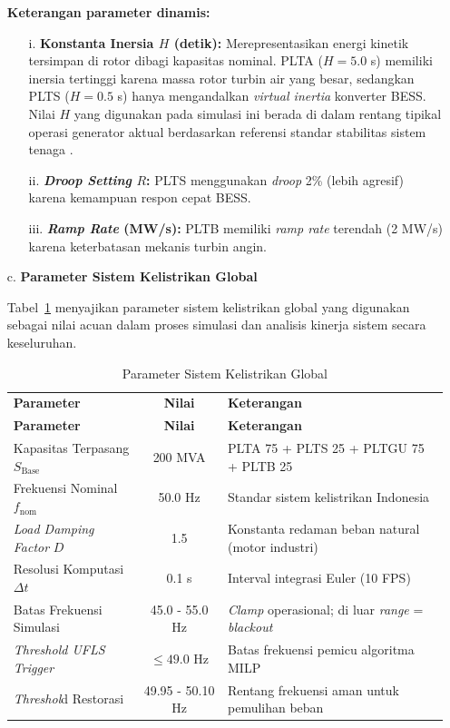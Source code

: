 \begin{enumerate}
\noindent\textbf{Keterangan parameter dinamis:}
\begin{itemize}
    \item[i.] \textbf{Konstanta Inersia $H$ (detik):} Merepresentasikan energi kinetik tersimpan di rotor dibagi kapasitas nominal. PLTA ($H = 5{.}0$ s) memiliki inersia tertinggi karena massa rotor turbin air yang besar, sedangkan PLTS ($H = 0{.}5$ s) hanya mengandalkan \textit{virtual inertia} konverter BESS. Nilai $H$ yang digunakan pada simulasi ini berada di dalam rentang tipikal operasi generator aktual berdasarkan referensi standar stabilitas sistem tenaga \cite{Kundur1994}.
    \item[ii.] \textbf{\textit{Droop Setting} $R$:} PLTS menggunakan \textit{droop} 2\% (lebih agresif) karena kemampuan respon cepat BESS.
    \item[iii.] \textbf{\textit{Ramp Rate} (MW/s):} PLTB memiliki \textit{ramp rate} terendah (2 MW/s) karena keterbatasan mekanis turbin angin.
\end{itemize}

\item[c.] \textbf{Parameter Sistem Kelistrikan Global}

Tabel~\ref{tab:global} menyajikan parameter sistem kelistrikan global yang digunakan sebagai nilai acuan dalam proses simulasi dan analisis kinerja sistem secara keseluruhan.

\begin{longtable}{|p{6.5cm}|c|p{5.5cm}|}
    \caption{Parameter Sistem Kelistrikan Global}
    \label{tab:global}
    \vspace{-0.75em}\\
    \hline
    \textbf{Parameter} & \textbf{Nilai} & \textbf{Keterangan} \\ \hline
    \endfirsthead
    \hline
    \textbf{Parameter} & \textbf{Nilai} & \textbf{Keterangan} \\ \hline
    \endhead
    Kapasitas Terpasang $S_{\mathrm{Base}}$ & 200 MVA         & PLTA 75 + PLTS 25 + PLTGU 75 + PLTB 25 \\ \hline
    Frekuensi Nominal $f_{\mathrm{nom}}$    & 50.0 Hz         & Standar sistem kelistrikan Indonesia \\ \hline
    \textit{Load Damping Factor} $D$                 & 1.5             & Konstanta redaman beban natural (motor industri) \\ \hline
    Resolusi Komputasi $\Delta t$           & 0.1 s           & Interval integrasi Euler (10 FPS) \\ \hline
    Batas Frekuensi Simulasi                & 45.0 - 55.0 Hz   & \textit{Clamp} operasional; di luar \textit{range} = \textit{blackout} \\ \hline
    \textit{Threshold UFLS Trigger}                  & $\leq 49{.}0$ Hz & Batas frekuensi pemicu algoritma MILP \\ \hline
    \textit{Threshol}d Restorasi                     & 49.95 - 50.10 Hz & Rentang frekuensi aman untuk pemulihan beban \\ \hline
\end{longtable}
\end{enumerate}

